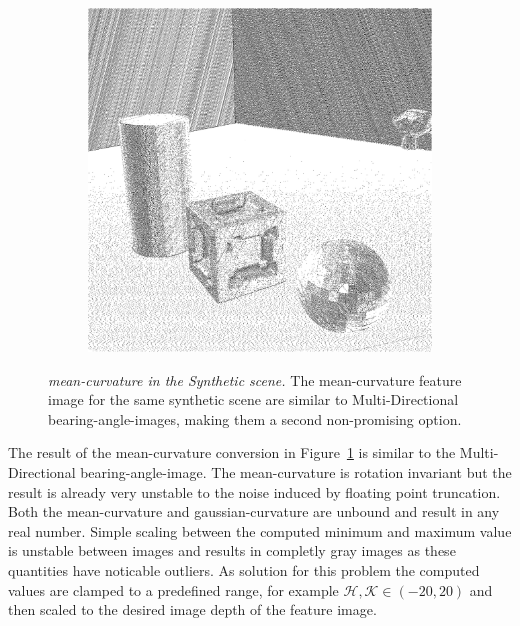 \begin{figure}[H]
\begin{subfigure}[t]{0.32\textwidth}
    \end{subfigure}
    \begin{subfigure}[t]{0.32\textwidth}
        \includegraphics[width=\linewidth]{chapter04/img/mean-0210.png}
    \end{subfigure}
    \caption[\Gls{mean-curvature} in the \emph{Synthetic} scene]{\emph{\Gls{mean-curvature} in the Synthetic scene.} The \Gls{mean-curvature} feature image for the same synthetic scene are similar to Multi-Directional \Glspl{bearing-angle-image}, making them a second non-promising option.}\label{fig:mean-curvature}
\end{figure}
The result of the \Gls{mean-curvature} conversion in Figure~\ref{fig:mean-curvature} is similar to the Multi-Directional \gls{bearing-angle-image}.
The \gls{mean-curvature} is rotation invariant but the result is already very unstable to the noise induced by floating point truncation.
Both the \gls{mean-curvature} and \gls{gaussian-curvature} are unbound and result in any real number.
Simple scaling between the computed minimum and maximum value is unstable between images and results in completly gray images as these quantities have noticable outliers.
As solution for this problem the computed values are clamped to a predefined range, for example $\mathcal{H},\mathcal{K} \in (-20, 20)$ and then scaled to the desired image depth of the feature image.

